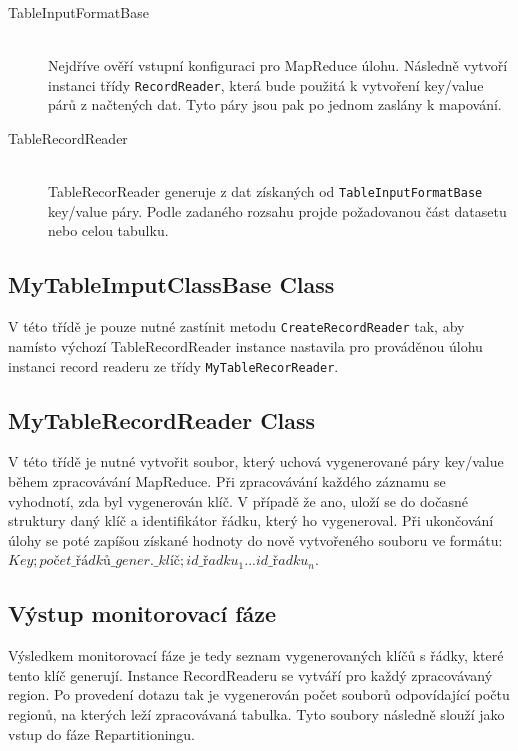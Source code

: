\documentclass[thesis=M,czech]{FITthesis}[2012/06/26]
\begin{document}
\begin{description}
\item[TableInputFormatBase] \hfill \\
Nejdříve ověří vstupní konfiguraci pro MapReduce úlohu. Následně \linebreak vytvoří instanci třídy \texttt{RecordReader}, která bude použitá k vytvoření key/value párů z načtených dat. Tyto páry jsou pak po jednom zaslány k mapování.

\item[TableRecordReader] \hfill \\
TableRecorReader generuje z dat získaných od \texttt{TableInputFormatBase} key/value páry. Podle zadaného rozsahu projde požadovanou část datasetu nebo celou tabulku. 
\end{description}

\subsection{MyTableImputClassBase Class}
V této třídě je pouze nutné zastínit metodu \texttt{CreateRecordReader} tak, aby \linebreak namísto výchozí TableRecordReader instance nastavila pro prováděnou úlohu instanci record readeru ze třídy \texttt{MyTableRecorReader}.


\subsection{MyTableRecordReader Class}
V této třídě je nutné vytvořit soubor, který uchová vygenerované páry \linebreak key/value během zpracovávání MapReduce. Při zpracovávání každého \linebreak záznamu se vyhodnotí, zda byl vygenerován klíč. V případě že ano, uloží se do dočasné struktury daný klíč a identifikátor řádku, který ho vygeneroval. Při ukončování úlohy se poté zapíšou získané hodnoty do nově vytvořeného souboru ve formátu:
 $Key;počet\_řádků\_gener.\_klíč;id\_řadku_1 ... id\_řadku_n$. 
 
 \subsection{Výstup monitorovací fáze}
 Výsledkem monitorovací fáze je tedy seznam vygenerovaných klíčů s řádky, které tento klíč generují. Instance RecordReaderu se vytváří pro každý zpracovávaný region. Po provedení dotazu tak je vygenerován počet souborů odpovídající počtu regionů, na kterých leží zpracovávaná tabulka. Tyto soubory následně slouží jako vstup do fáze Repartitioningu.
 
\end{document}
